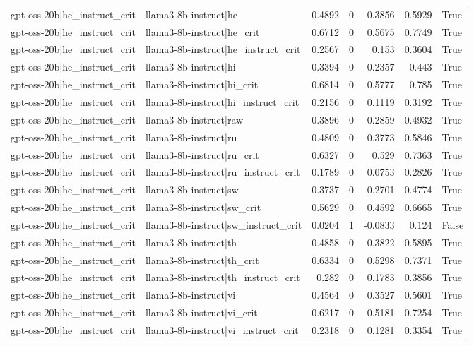 \begin{table}
\begin{tabular}{l l r r r r l}
gpt-oss-20b|he_instruct_crit & llama3-8b-instruct|he & 0.4892 & 0 & 0.3856 & 0.5929 & True \\
gpt-oss-20b|he_instruct_crit & llama3-8b-instruct|he_crit & 0.6712 & 0 & 0.5675 & 0.7749 & True \\
gpt-oss-20b|he_instruct_crit & llama3-8b-instruct|he_instruct_crit & 0.2567 & 0 & 0.153 & 0.3604 & True \\
gpt-oss-20b|he_instruct_crit & llama3-8b-instruct|hi & 0.3394 & 0 & 0.2357 & 0.443 & True \\
gpt-oss-20b|he_instruct_crit & llama3-8b-instruct|hi_crit & 0.6814 & 0 & 0.5777 & 0.785 & True \\
gpt-oss-20b|he_instruct_crit & llama3-8b-instruct|hi_instruct_crit & 0.2156 & 0 & 0.1119 & 0.3192 & True \\
gpt-oss-20b|he_instruct_crit & llama3-8b-instruct|raw & 0.3896 & 0 & 0.2859 & 0.4932 & True \\
gpt-oss-20b|he_instruct_crit & llama3-8b-instruct|ru & 0.4809 & 0 & 0.3773 & 0.5846 & True \\
gpt-oss-20b|he_instruct_crit & llama3-8b-instruct|ru_crit & 0.6327 & 0 & 0.529 & 0.7363 & True \\
gpt-oss-20b|he_instruct_crit & llama3-8b-instruct|ru_instruct_crit & 0.1789 & 0 & 0.0753 & 0.2826 & True \\
gpt-oss-20b|he_instruct_crit & llama3-8b-instruct|sw & 0.3737 & 0 & 0.2701 & 0.4774 & True \\
gpt-oss-20b|he_instruct_crit & llama3-8b-instruct|sw_crit & 0.5629 & 0 & 0.4592 & 0.6665 & True \\
gpt-oss-20b|he_instruct_crit & llama3-8b-instruct|sw_instruct_crit & 0.0204 & 1 & -0.0833 & 0.124 & False \\
gpt-oss-20b|he_instruct_crit & llama3-8b-instruct|th & 0.4858 & 0 & 0.3822 & 0.5895 & True \\
gpt-oss-20b|he_instruct_crit & llama3-8b-instruct|th_crit & 0.6334 & 0 & 0.5298 & 0.7371 & True \\
gpt-oss-20b|he_instruct_crit & llama3-8b-instruct|th_instruct_crit & 0.282 & 0 & 0.1783 & 0.3856 & True \\
gpt-oss-20b|he_instruct_crit & llama3-8b-instruct|vi & 0.4564 & 0 & 0.3527 & 0.5601 & True \\
gpt-oss-20b|he_instruct_crit & llama3-8b-instruct|vi_crit & 0.6217 & 0 & 0.5181 & 0.7254 & True \\
gpt-oss-20b|he_instruct_crit & llama3-8b-instruct|vi_instruct_crit & 0.2318 & 0 & 0.1281 & 0.3354 & True \\

\end{tabular}
\end{table}
